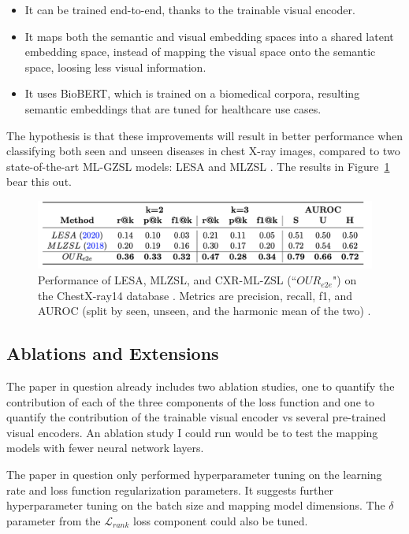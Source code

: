 \documentclass[letterpaper]{article} %
\begin{document}
\begin{itemize}
    \item It can be trained end-to-end, thanks to the trainable visual encoder.
    \item It maps both the semantic and visual embedding spaces into a shared latent embedding space, instead of mapping the visual space onto the semantic space, loosing less visual information.
    \item It uses BioBERT, which is trained on a biomedical corpora, resulting semantic embeddings that are tuned for healthcare use cases.
\end{itemize}

The hypothesis is that these improvements will result in better performance when classifying both seen and unseen diseases in chest X-ray images, compared to two state-of-the-art ML-GZSL models: LESA \cite{9157745} and MLZSL \cite{lee2018multilabelzeroshotlearningstructured}. The results in Figure~\ref{fig:results} bear this out.

\begin{figure}[h!]
\centering
\includegraphics[width=0.9\columnwidth]{results.png}
\caption{Performance of LESA, MLZSL, and CXR-ML-ZSL (``$OUR_{e2e}$") on the ChestX-ray14 database \cite{Wang_2017}. Metrics are precision, recall, f1, and AUROC (split by seen, unseen, and the harmonic mean of the two) \cite{hayat2021multilabel}.}
\label{fig:results}
\end{figure}

\subsection{Ablations and Extensions}
\label{sec:ablations-and-extensions}

The paper in question already includes two ablation studies, one to quantify the contribution of each of the three components of the loss function and one to quantify the contribution of the trainable visual encoder vs several pre-trained visual encoders. An ablation study I could run would be to test the mapping models with fewer neural network layers.

The paper in question only performed hyperparameter tuning on the learning rate and loss function regularization parameters. It suggests further hyperparameter tuning on the batch size and mapping model dimensions. The $\delta$ parameter from the \texorpdfstring{$\mathcal{L}_{rank}$}: loss component could also be tuned.
\end{document}
